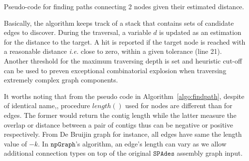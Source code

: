 \documentclass[10pt,letterpaper]{article}
\newcommand{\npgraph}{$\mathtt{npGraph}$}
\newcommand{\spades}{$\mathtt{SPAdes}$}
\newcommand{\IE}{\emph{i.e.}}
\begin{document}
\begin{algorithm}[!hpt]
\DontPrintSemicolon
{}
\caption{Pseudo-code for finding paths connecting 2 nodes given their estimated distance.}
\label{algo:findpath}
\end{algorithm}

Basically, the algorithm keeps track of a stack that contains sets of candidate edges to discover. During the traversal, a variable $d$ is updated as an estimation for the distance to the target. A hit is reported if the target node is reached with a reasonable distance \IE{} close to zero, within a given tolerance (line 21). 
Another threshold for the maximum traversing depth is set and heuristic cut-off can be used to preven exceptional combinatorial explosion when traversing extremely complex graph components.

It worths noting that from the pseudo code in Algorithm~\ref{algo:findpath}, despite of identical name,, procedure $length()$ used for nodes are different than for edges. The former would return the contig length while the latter measure the overlap or distance between a pair of contigs thus can be negative or positive respectively. From De Bruijin graph for instance, all edges have same the length value of $-k$. In \npgraph{}'s algorithm, an edge's length can vary as we allow additional connection types on top of the original \spades{} assembly graph input.
\end{document}
